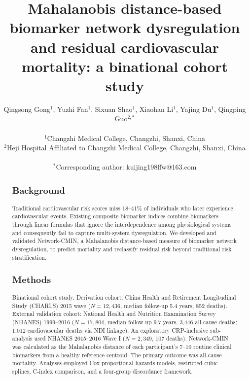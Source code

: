 \documentclass[11pt,a4paper]{article}
\title{\textbf{Mahalanobis distance-based biomarker network dysregulation and residual cardiovascular mortality: a binational cohort study}}
\author{
Qingsong Gong$^{1}$, Yuzhi Fan$^{1}$, Sixuan Shao$^{1}$, Xiaohan Li$^{1}$, Yajing Du$^{1}$, Qingping Guo$^{2,*}$\\
\\
$^{1}$Changzhi Medical College, Changzhi, Shanxi, China\\
$^{2}$Heji Hospital Affiliated to Changzhi Medical College, Changzhi, Shanxi, China\\
\\
$^{*}$Corresponding author: kuijing198ffw@163.com\\
}
\date{}
\begin{document}
\maketitle

\begin{abstract}
\subsection*{Background}
Traditional cardiovascular risk scores miss 18--41\% of individuals who later experience cardiovascular events. Existing composite biomarker indices combine biomarkers through linear formulas that ignore the interdependence among physiological systems and consequently fail to capture multi-system dysregulation. We developed and validated Network-CMIN, a Mahalanobis distance-based measure of biomarker network dysregulation, to predict mortality and reclassify residual risk beyond traditional risk stratification.

\subsection*{Methods}
Binational cohort study. Derivation cohort: China Health and Retirement Longitudinal Study (CHARLS) 2015 wave ($N = 12{,}436$, median follow-up 5.4 years, 852 deaths). External validation cohort: National Health and Nutrition Examination Survey (NHANES) 1999--2016 ($N = 17{,}804$, median follow-up 9.7 years, 3,446 all-cause deaths; 1,012 cardiovascular deaths via NDI linkage). An exploratory CRP-inclusive sub-analysis used NHANES 2015--2016 Wave I ($N = 2{,}349$, 107 deaths). Network-CMIN was calculated as the Mahalanobis distance of each participant's 7--10 routine clinical biomarkers from a healthy reference centroid. The primary outcome was all-cause mortality. Analyses employed Cox proportional hazards models, restricted cubic splines, C-index comparison, and a four-group discordance framework.


\end{abstract}
\end{document}

